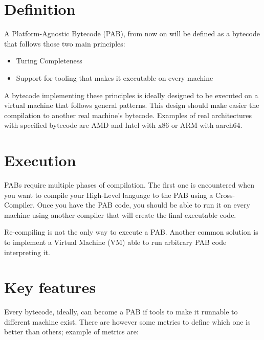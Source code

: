 \section{Definition}

A Platform-Agnostic Bytecode (PAB), from now on will be defined as a bytecode that follows those two main principles:
\begin{itemize}
    \item Turing Completeness
    \item Support for tooling that makes it executable on every machine
\end{itemize}

A bytecode implementing these principles is ideally designed to be executed on a virtual machine that follows general patterns. This design should make easier the compilation to another real machine's bytecode. Examples of real architectures with specified bytecode are AMD and Intel with x86 or ARM with aarch64. %

\section{Execution}

PABs require multiple phases of compilation. The first one is encountered when you want to compile your High-Level language to the PAB using a Cross-Compiler. Once you have the PAB code, you should be able to run it on every machine using another compiler that will create the final executable code.

Re-compiling is not the only way to execute a PAB. Another common solution is to implement a Virtual Machine (VM) able to run arbitrary PAB code interpreting it.

\section{Key features}

Every bytecode, ideally, can become a PAB if tools to make it runnable to different machine exist. There are however some metrics to define which one is better than others; example of metrics are:

